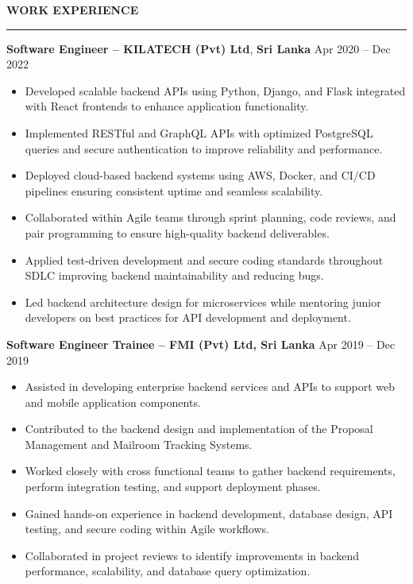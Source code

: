 \documentclass[10pt,letterpaper]{article}
\begin{document}
\vspace{8pt}

\textbf{WORK EXPERIENCE}\\[-8pt]
\noindent\rule{\textwidth}{1pt}

\vspace{-2pt}

\textbf{Software Engineer -- KILATECH (Pvt) Ltd}, \textbf{Sri Lanka} \hfill Apr 2020 -- Dec 2022

\vspace{-1pt}

\begin{itemize}
\item Developed scalable backend APIs using Python, Django, and Flask integrated with React frontends to enhance application functionality.
\item Implemented RESTful and GraphQL APIs with optimized PostgreSQL queries and secure authentication to improve reliability and performance.
\item Deployed cloud-based backend systems using AWS, Docker, and CI/CD pipelines ensuring consistent uptime and seamless scalability.
\item Collaborated within Agile teams through sprint planning, code reviews, and pair programming to ensure high-quality backend deliverables.
\item Applied test-driven development and secure coding standards throughout SDLC improving backend maintainability and reducing bugs.
\item Led backend architecture design for microservices while mentoring junior developers on best practices for API development and deployment.
\end{itemize}

\textbf{Software Engineer Trainee -- FMI (Pvt) Ltd, Sri Lanka} \hfill Apr 2019 -- Dec 2019

\vspace{-1pt}

\begin{itemize}
\item Assisted in developing enterprise backend services and APIs to support web and mobile application components.
\item Contributed to the backend design and implementation of the Proposal Management and Mailroom Tracking Systems.
\item Worked closely with cross functional teams to gather backend requirements, perform integration testing, and support deployment phases.
\item Gained hands-on experience in backend development, database design, API testing, and secure coding within Agile workflows.
\item Collaborated in project reviews to identify improvements in backend performance, scalability, and database query optimization.
\end{itemize}
\end{document}
